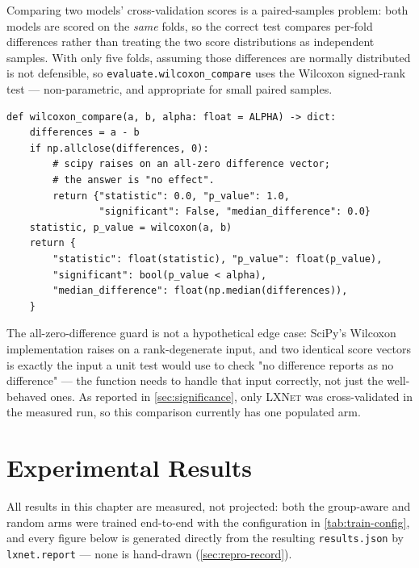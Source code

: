 \documentclass[11pt,a4paper,oneside]{report}
\newcommand{\LXNet}{\textsc{LXNet}}
\newcommand{\code}[1]{\texttt{\small #1}}
\begin{document}
Comparing two models' cross-validation scores is a paired-samples problem:
both models are scored on the \emph{same} folds, so the correct test compares
per-fold differences rather than treating the two score distributions as
independent samples. With only five folds, assuming those differences are
normally distributed is not defensible, so
\code{evaluate.wilcoxon\_compare} uses the Wilcoxon signed-rank test
\cite{wilcoxon1945} --- non-parametric, and appropriate for small paired
samples.

\begin{lstlisting}[caption={Paired, non-parametric comparison across
cross-validation folds (\texttt{lxnet/evaluate.py}).}, label=lst:wilcoxon]
def wilcoxon_compare(a, b, alpha: float = ALPHA) -> dict:
    differences = a - b
    if np.allclose(differences, 0):
        # scipy raises on an all-zero difference vector;
        # the answer is "no effect".
        return {"statistic": 0.0, "p_value": 1.0,
                "significant": False, "median_difference": 0.0}
    statistic, p_value = wilcoxon(a, b)
    return {
        "statistic": float(statistic), "p_value": float(p_value),
        "significant": bool(p_value < alpha),
        "median_difference": float(np.median(differences)),
    }
\end{lstlisting}

The all-zero-difference guard is not a hypothetical edge case: SciPy's
Wilcoxon implementation raises on a rank-degenerate input, and two identical
score vectors is exactly the input a unit test would use to check "no
difference reports as no difference" --- the function needs to handle that
input correctly, not just the well-behaved ones. As reported in
\cref{sec:significance}, only \LXNet{} was cross-validated in the measured
run, so this comparison currently has one populated arm.

\chapter{Experimental Results}
\label{ch:results}

All results in this chapter are measured, not projected: both the
group-aware and random arms were trained end-to-end with the configuration
in \cref{tab:train-config}, and every figure below is generated directly
from the resulting \texttt{results.json} by \code{lxnet.report} --- none is
hand-drawn (\cref{sec:repro-record}).
\end{document}
